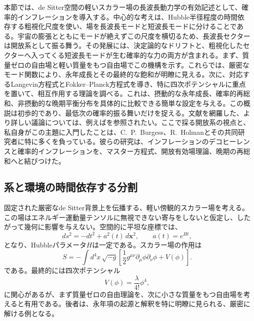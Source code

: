 \documentclass[a4paper,11pt,oneside]{article}
\theoremstyle{definition}
\numberwithin{equation}{section}
\begin{document}
本節では、de Sitter空間の軽いスカラー場の長波長動力学の有効記述として、確率的インフレーションを導入する。中心的な考えは、Hubble半径程度の時間依存する粗視化尺度を使い、場を長波長モードと短波長モードに分けることである。宇宙の膨張とともにモードが絶えずこの尺度を横切るため、長波長セクターは開放系として振る舞う。その発展には、決定論的なドリフトと、粗視化したセクターへ入ってくる短波長モードが生む確率的な力の両方が含まれる。まず、質量ゼロの自由場と軽い質量をもつ自由場でこの機構を示す。これらでは、厳密なモード関数により、永年成長とその最終的な飽和が明瞭に見える。次に、対応するLangevin方程式とFokker--Planck方程式を導き、特に四次ポテンシャルに重点を置いて、相互作用する理論を調べる。これは、摂動的な永年成長、確率的再総和、非摂動的な晩期平衡分布を具体的に比較できる簡単な設定を与える。この概説は初歩的であり、最低次の確率的振る舞いだけを捉える。文献を網羅した、より詳しい議論については、例えば\cite{Woodard:2025cez,Cruces:2022imf,Vennin:2020kng}を参照されたい。ここで採る開放系の視点と、私自身がこの主題に入門したことは、C.~P.~Burgess、R.~Holmanとその共同研究者に特に多くを負っている。彼らの研究は、インフレーションのデコヒーレンスと確率的インフレーションを、マスター方程式、開放有効場理論、晩期の再総和へと結びつけた\cite{Burgess:2006jn,Burgess:2014eoa,Burgess:2015ajz}。





\subsection{系と環境の時間依存する分割}
\label{sec:stochastic-secular-growth}



固定された厳密なde Sitter背景上を伝播する、軽い傍観的スカラー場を考える。この場はエネルギー運動量テンソルに無視できない寄与をしないと仮定し、したがって幾何に影響を与えない。空間的に平坦な座標では、
\begin{equation}
ds^{2}
=
-dt^{2}
+
a^{2}(t)\,d\mathbf{x}^{2},
\qquad
a(t)
=
e^{Ht},
\end{equation}
となり、Hubbleパラメータ\(H\)は一定である。スカラー場の作用は
\begin{equation}
S
=
-\int d^{4}x\,\sqrt{-g}
\left[
\frac{1}{2}
g^{\mu\nu}
\partial_{\mu}\phi
\partial_{\nu}\phi
+
V(\phi)
\right].
\end{equation}
である。最終的には四次ポテンシャル
\begin{equation}
V(\phi)
=
\frac{\lambda}{4!}\phi^{4},
\end{equation}
に関心があるが、まず質量ゼロの自由理論を、次に小さな質量をもつ自由場を考えると有用である。後者は、永年項の起源と解釈を特に明瞭に見られる、厳密に解ける例となる。
\end{document}
